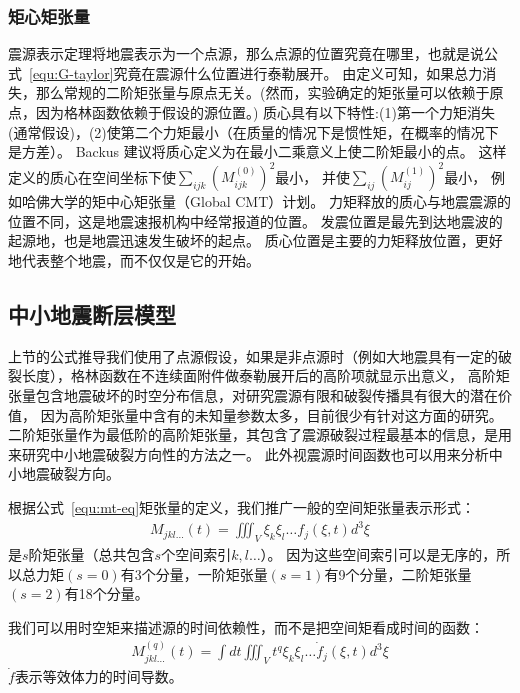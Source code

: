 \subsubsection{矩心矩张量}
震源表示定理将地震表示为一个点源，那么点源的位置究竟在哪里，也就是说公式~\ref{equ:G-taylor}究竟在震源什么位置进行泰勒展开。
由定义可知，如果总力消失，那么常规的二阶矩张量与原点无关。(然而，实验确定的矩张量可以依赖于原点，因为格林函数依赖于假设的源位置。)
质心具有以下特性:(1)第一个力矩消失(通常假设)，(2)使第二个力矩最小（在质量的情况下是惯性矩，在概率的情况下是方差）。
Backus\citep{backus1977interpreting} 建议将质心定义为在最小二乘意义上使二阶矩最小的点。
这样定义的质心在空间坐标下使$\sum\nolimits_{ijk}{(M_{ijk}^{(0)})}^2$最小，
并使$\sum\nolimits_{ij}{(M_{ij}^{(1)})}^2$最小，
例如哈佛大学的矩中心矩张量（Global CMT）计划\citep{Dziewonski1981}。
力矩释放的质心与地震震源的位置不同，这是地震速报机构中经常报道的位置。
发震位置是最先到达地震波的起源地，也是地震迅速发生破坏的起点。
质心位置是主要的力矩释放位置，更好地代表整个地震，而不仅仅是它的开始。


\subsection{中小地震断层模型}
上节的公式推导我们使用了点源假设，如果是非点源时（例如大地震具有一定的破裂长度），格林函数在不连续面附件做泰勒展开后的高阶项就显示出意义，
高阶矩张量包含地震破坏的时空分布信息，对研究震源有限和破裂传播具有很大的潜在价值，
因为高阶矩张量中含有的未知量参数太多，目前很少有针对这方面的研究。
二阶矩张量作为最低阶的高阶矩张量，其包含了震源破裂过程最基本的信息，是用来研究中小地震破裂方向性的方法之一。
此外视震源时间函数也可以用来分析中小地震破裂方向。

根据公式~\ref{equ:mt-eq}矩张量的定义，我们推广一般的空间矩张量表示形式：
\begin{align}
    M_{jkl\dots}(t) =  \iiint\nolimits_{V} \xi_k \xi_l \dots f_j(\xi,t)  d^3\xi
  \label{equ:g-mt-eq}
\end{align}
是$s$阶矩张量（总共包含$s$个空间索引$k,l\dots$）。
因为这些空间索引可以是无序的，所以总力矩$(s=0)$有3个分量，一阶矩张量$(s=1)$有9个分量，二阶矩张量$(s=2)$有18个分量。

我们可以用时空矩来描述源的时间依赖性，而不是把空间矩看成时间的函数：
\begin{align}
    M_{jkl\dots}^{(q)}(t) = \int dt \iiint\nolimits_{V} t^q \xi_k \xi_l \dots \dot f_j(\xi,t)  d^3\xi
  \label{equ:st-mt-eq}
\end{align}
$\dot f$表示等效体力的时间导数。





